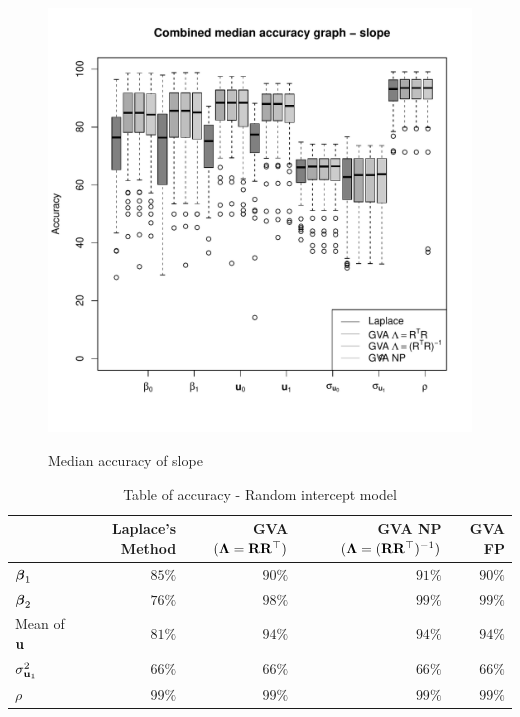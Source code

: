 			\begin{figure}
				\includegraphics[width=120mm, height=120mm]{code/results/median_accuracy_combined_slope.pdf}
				\caption{Median accuracy of slope}
				\label{fig:median_accuracy_slope}
			\end{figure}
					
			\begin{table}
				\caption{Table of accuracy - Random intercept model}
				\label{tab:accuracy_int}
				\begin{tabular}{|l|rrrr|}
					\hline
					                   & Laplace's Method & GVA $({\boldsymbol \Lambda} = {\bf R} {\bf R}^\top)$ & GVA NP $({\boldsymbol \Lambda} = ({\bf R} {\bf R}^\top)^{-1})$ & GVA FP \\
					\hline
					${\boldsymbol \beta}_1$         & $85\%$           & $90\%$                          & $91\%$                                    & $90\%$ \\ 
					${\boldsymbol \beta}_2$         & $76\%$           & $98\%$                          & $99\%$                                    & $99\%$ \\ 
					Mean of ${\bf u}$      & $81\%$           & $94\%$                          & $94\%$                                    & $94\%$ \\
					$\sigma^2_{{\bf u}_1}$ & $66\%$           & $66\%$                          & $66\%$                                    & $66\%$ \\ 
					$\rho$             & $99\%$           & $99\%$                          & $99\%$                                    & $99\%$ \\ 
					\hline
				\end{tabular}
			\end{table}
					
